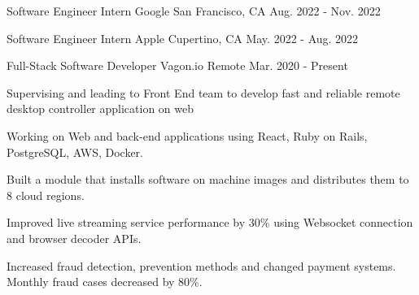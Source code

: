 
\begin{cventries}
  \cvopenentry
   {Software Engineer Intern
   } %
    {Google} %
    {San Francisco, CA} %
    {Aug. 2022 - Nov. 2022} %
    {
      \begin{cvitems} %
        \item {}
      \end{cvitems}
    }
  \cvopenentry
   {Software Engineer Intern
   } %
    {Apple} %
    {Cupertino, CA} %
    {May. 2022 - Aug. 2022} %
    {
      \begin{cvitems} %
        \item {}
      \end{cvitems}
    }
  \cvopenentry
   {Full-Stack Software Developer
   } %
    {Vagon.io} %
    {Remote} %
    {Mar. 2020 - Present} %
    {
      \begin{cvitems} %
        \item {Supervising and leading to Front End team to develop fast and reliable remote desktop controller application on web}
        \item {Working on Web and back-end applications using React, Ruby on Rails, PostgreSQL, AWS, Docker.}
        \item {Built a module that installs software on machine images and distributes them to 8 cloud regions.}
		\item {Improved live streaming service performance by 30\% using Websocket connection and browser decoder APIs.}
		\item {Increased fraud detection, prevention methods and changed payment systems. Monthly fraud cases decreased by 80\%.}
      \end{cvitems}
    }

\end{cventries}

